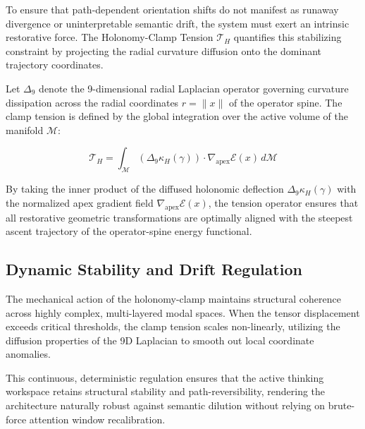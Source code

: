 To ensure that path-dependent orientation shifts do not manifest as runaway divergence or uninterpretable semantic drift, the system must exert an intrinsic restorative force. The Holonomy-Clamp Tension $\mathcal{T}_H$ quantifies this stabilizing constraint by projecting the radial curvature diffusion onto the dominant trajectory coordinates.

Let $\Delta_9$ denote the 9-dimensional radial Laplacian operator governing curvature dissipation across the radial coordinates $r = \|x\|$ of the operator spine. The clamp tension is defined by the global integration over the active volume of the manifold $\mathcal{M}$:

\[
\mathcal{T}_H = \int_{\mathcal{M}} \left( \Delta_9 \mathcal{\kappa}_H(\gamma) \right) \cdot \nabla_{\mathrm{apex}} \mathcal{E}(x) \, d\mathcal{M}
\]

By taking the inner product of the diffused holonomic deflection $\Delta_9 \mathcal{\kappa}_H(\gamma)$ with the normalized apex gradient field $\nabla_{\mathrm{apex}} \mathcal{E}(x)$, the tension operator ensures that all restorative geometric transformations are optimally aligned with the steepest ascent trajectory of the operator-spine energy functional.

\subsection{Dynamic Stability and Drift Regulation}

The mechanical action of the holonomy-clamp maintains structural coherence across highly complex, multi-layered modal spaces. When the tensor displacement exceeds critical thresholds, the clamp tension scales non-linearly, utilizing the diffusion properties of the 9D Laplacian to smooth out local coordinate anomalies. 

This continuous, deterministic regulation ensures that the active thinking workspace retains structural stability and path-reversibility, rendering the architecture naturally robust against semantic dilution without relying on brute-force attention window recalibration.
